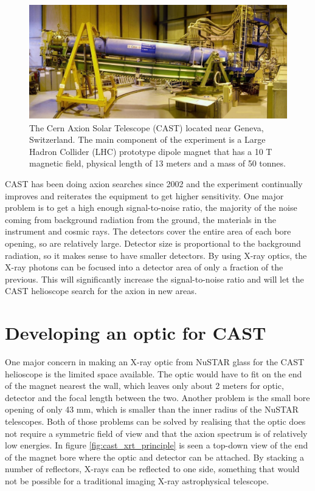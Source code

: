 \begin{figure}[htbp]
  \centering
    \includegraphics[height=5cm]{figures/cast/cast_instrument.jpg}
  \caption{\footnotesize The Cern Axion Solar Telescope (CAST) located near Geneva, Switzerland. The main component of the experiment is a Large Hadron Collider (LHC) prototype dipole magnet that has a 10 T magnetic field, physical length of 13 meters and a mass of 50 tonnes.}
  \label{fig:cast_instrument}
\end{figure}

CAST has been doing axion searches since 2002 and the experiment continually improves and reiterates the equipment to get higher sensitivity. One major problem is to get a high enough signal-to-noise ratio, the majority of the noise coming from background radiation from the ground, the materials in the instrument and cosmic rays. The detectors cover the entire area of each bore opening, so are relatively large. Detector size is proportional to the background radiation, so it makes sense to have smaller detectors. By using X-ray optics, the X-ray photons can be focused into a detector area of only a fraction of the previous. This will significantly increase the signal-to-noise ratio and will let the CAST helioscope search for the axion in new areas.

\section{Developing an optic for CAST}
One major concern in making an X-ray optic from NuSTAR glass for the CAST helioscope is the limited space available. The optic would have to fit on the end of the magnet nearest the wall, which leaves only about 2 meters for optic, detector and the focal length between the two. Another problem is the small bore opening of only 43 mm, which is smaller than the inner radius of the NuSTAR telescopes. Both of those problems can be solved by realising that the optic does not require a symmetric field of view and that the axion spectrum is of relatively low energies. In figure \ref{fig:cast_xrt_principle} is seen a top-down view of the end of the magnet bore where the optic and detector can be attached. By stacking a number of reflectors, X-rays can be reflected to one side, something that would not be possible for a traditional imaging X-ray astrophysical telescope.

